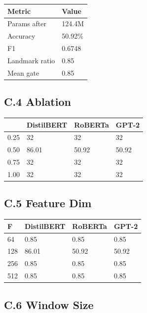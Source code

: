 \begin{table}[H]
\centering
\small
\begin{tabular}{ll}
\toprule
\textbf{Metric} & \textbf{Value} \\
\midrule
Params after & 124.4M \\
Accuracy & 50.92\% \\
F1 & 0.6748 \\
Landmark ratio & 0.85 \\
Mean gate & 0.85 \\
\bottomrule
\end{tabular}
\end{table}

\subsection{C.4   Ablation}

\begin{table}[H]
\centering
\small
\begin{tabular}{llll}
\toprule
\textbf{} & \textbf{DistilBERT} & \textbf{RoBERTa} & \textbf{GPT-2} \\
\midrule
0.25 & 32 & 32 & 32 \\
0.50 & 86.01 & 50.92 & 50.92 \\
0.75 & 32 & 32 & 32 \\
1.00 & 32 & 32 & 32 \\
\bottomrule
\end{tabular}
\end{table}

\subsection{C.5 Feature Dim}

\begin{table}[H]
\centering
\small
\begin{tabular}{llll}
\toprule
\textbf{F} & \textbf{DistilBERT} & \textbf{RoBERTa} & \textbf{GPT-2} \\
\midrule
64 & 0.85 & 0.85 & 0.85 \\
128 & 86.01 & 50.92 & 50.92 \\
256 & 0.85 & 0.85 & 0.85 \\
512 & 0.85 & 0.85 & 0.85 \\
\bottomrule
\end{tabular}
\end{table}

\subsection{C.6 Window Size}

